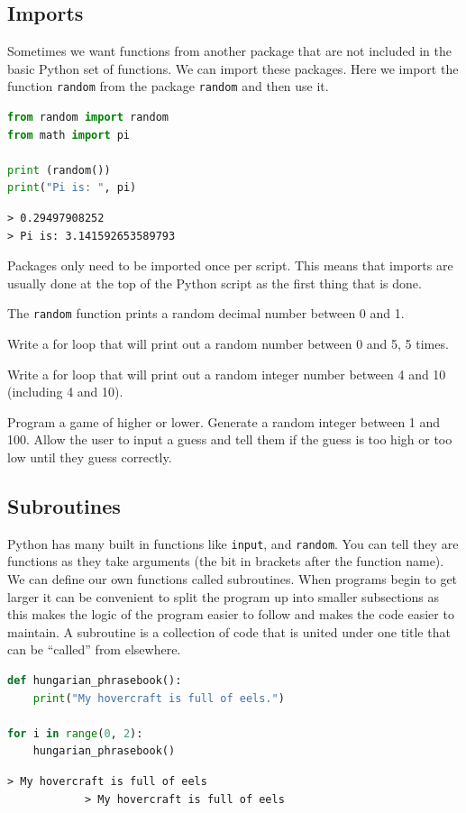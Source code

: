 	\subsection{Imports}
		Sometimes we want functions from another package that are not included in the basic Python set of functions. We can import these packages. Here we import the function \texttt{random} from the package \texttt{random} and then use it.
		\begin{lstlisting}[language=Python]
from random import random
from math import pi

print (random())
print("Pi is: ", pi)\end{lstlisting}
		\begin{verbatim}
> 0.29497908252
> Pi is: 3.141592653589793\end{verbatim}
		Packages only need to be imported once per script. This means that imports are usually done at the top of the Python script as the first thing that is done.
		
		The \texttt{random} function prints a random decimal number between 0 and 1.
		\begin{task}Write a for loop that will print out a random number between 0 and 5, 5 times.\end{task}
		\begin{task}Write a for loop that will print out a random integer number between 4 and 10 (including 4 and 10).\end{task}
		\begin{task}Program a game of higher or lower. Generate a random integer between 1 and 100. Allow the user to input a guess and tell them if the guess is too high or too low until they guess correctly.\end{task}		

	\subsection{Subroutines}
			Python has many built in functions like \texttt{input}, and \texttt{random}. You can tell they are functions as they take arguments (the bit in brackets after the function name). We can define our own functions called subroutines. When programs begin to get larger it can be convenient to split the program up into smaller subsections as this makes the logic of the program easier to follow and makes the code easier to maintain. A subroutine is a collection of code that is united under one title that can be ``called'' from elsewhere. 
			\begin{lstlisting}[language=Python]
def hungarian_phrasebook():
	print("My hovercraft is full of eels.")

for i in range(0, 2):
	hungarian_phrasebook()\end{lstlisting}
			\begin{verbatim}> My hovercraft is full of eels
			> My hovercraft is full of eels
			\end{verbatim}

